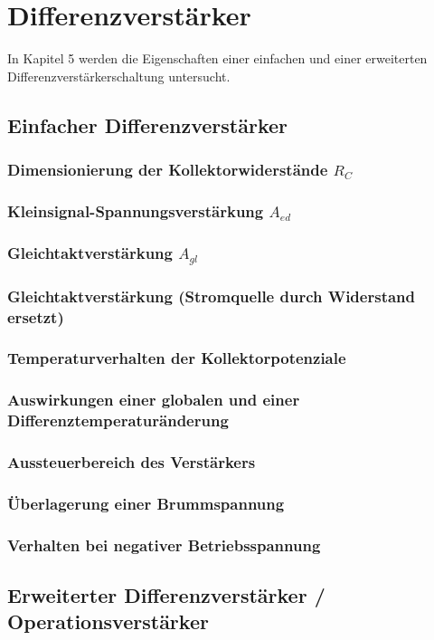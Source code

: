 \def\figpath{tex/5_Differenzverstaerker/pictures}
\graphicspath{{tex/5_Differenzverstaerker/pictures/}}

\chapter{Differenzverstärker}
In Kapitel 5 werden die Eigenschaften einer einfachen und einer erweiterten Differenzverstärkerschaltung untersucht.

\section{Einfacher Differenzverstärker}

\subsection{Dimensionierung der Kollektorwiderstände $R_C$}

\subsection{Kleinsignal-Spannungsverstärkung $A_{ed}$}

\subsection{Gleichtaktverstärkung $A_{gl}$}

\subsection{Gleichtaktverstärkung (Stromquelle durch Widerstand ersetzt)}

\subsection{Temperaturverhalten der Kollektorpotenziale}

\subsection{Auswirkungen einer globalen und einer Differenztemperaturänderung}

\subsection{Aussteuerbereich des Verstärkers}

\subsection{Überlagerung einer Brummspannung}

\subsection{Verhalten bei negativer Betriebsspannung}

\section{Erweiterter Differenzverstärker / Operationsverstärker}




